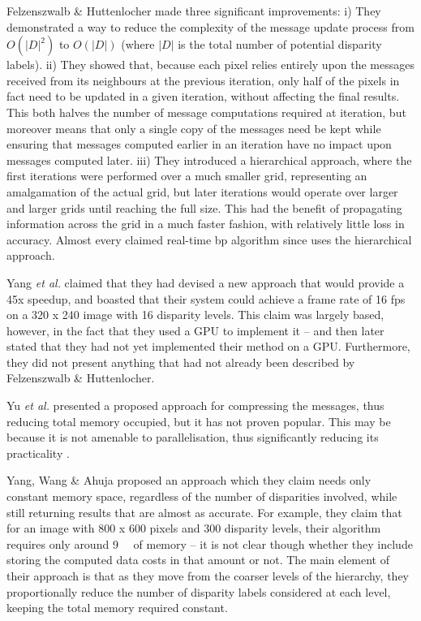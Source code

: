 Felzenszwalb \& Huttenlocher \cite{Felzenszwalb2006} made three significant improvements:  i) They demonstrated a way to reduce the complexity of the message update process from \(O(|D|^2)\) to \(O(|D|)\) (where \(|D|\) is the total number of potential disparity labels).  ii) They showed that, because each pixel relies entirely upon the messages received from its neighbours at the previous iteration, only half of the pixels in fact need to be updated in a given iteration, without affecting the final results.  This both halves the number of message computations required at iteration, but moreover means that only a single copy of the messages need be kept while ensuring that messages computed earlier in an iteration have no impact upon messages computed later.  iii)  They introduced a hierarchical approach, where the first iterations were performed over a much smaller grid, representing an amalgamation of the actual grid, but later iterations would operate over larger and larger grids until reaching the full size.  This had the benefit of propagating information across the grid in a much faster fashion, with relatively little loss in accuracy.  Almost every claimed real-time \gls{bp} algorithm since uses the hierarchical approach.

Yang \textit{et al.} \cite{Yang2006} claimed that they had devised a new approach that would provide a 45x speedup, and boasted that their system could achieve a frame rate of 16 \gls{fps} on a 320 x 240 image with 16 disparity levels.  This claim was largely based, however, in the fact that they used a GPU to implement it -- and then later stated that they had not yet implemented their method on a GPU.  Furthermore, they did not present anything that had not already been described by Felzenszwalb \& Huttenlocher.

Yu \textit{et al.} \cite{Yu2007} presented a proposed approach for compressing the messages, thus reducing total memory occupied, but it has not proven popular.  This may be because it is not amenable to parallelisation, thus significantly reducing its practicality \cite{Yang2010}.

Yang, Wang \& Ahuja \cite{Yang2010} proposed an approach which they claim needs only constant memory space, regardless of the number of disparities involved, while still returning results that are almost as accurate.  For example, they claim that for an image with 800 x 600 pixels and 300 disparity levels, their algorithm requires only around \SI{9}{\mebi\byte} of memory -- it is not clear though whether they include storing the computed data costs in that amount or not.  The main element of their approach is that as they move from the coarser levels of the hierarchy, they proportionally reduce the number of disparity labels considered at each level, keeping the total memory required constant.  %

